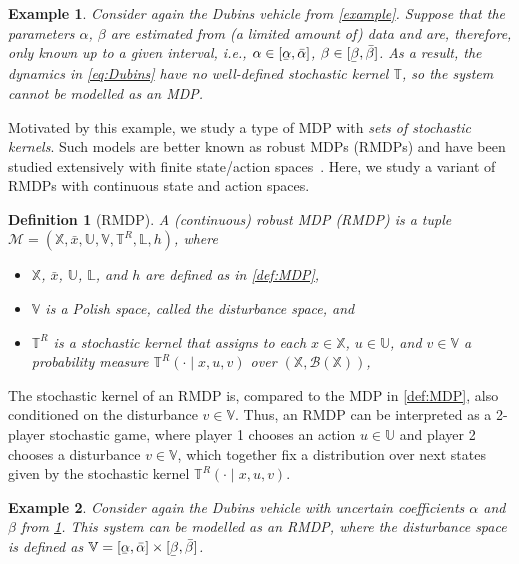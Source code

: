 \documentclass[letterpaper, 10 pt, conference]{ieeeconf}  %
\newcommand\munderbar[1]{%
  \underaccent{\bar}{#1}}
\newtheorem{example}{Example}
\newtheorem{definition}{Definition}
\newcommand*{\States}{\ensuremath{\mathbb{X}}}
\newcommand*{\Actions}{\ensuremath{\mathbb{U}}}
\newcommand*{\Disturb}{\ensuremath{\mathbb{V}}}
\newcommand*{\Labels}{\ensuremath{\mathbb{L}}}
\newcommand*{\initState}{\ensuremath{\bar{x}}}
\newcommand*{\transfunc}{\ensuremath{\mathbb{T}}}
\newcommand*{\transfuncR}{\ensuremath{\mathbb{T}^R}}
\newcommand*{\labelfunc}{\ensuremath{h}}
\newcommand*{\rmdp}{{\ensuremath{\mathcal{M}}}}
\newcommand*{\RMDP}{\ensuremath{\tuple{\States,\initState,\Actions,\Disturb,\transfuncR,\Labels,\labelfunc}}}
\newcommand*{\tuple}[1]{\left(#1\right)}
\newcommand*{\Borel}[1]{\ensuremath{\mathcal{B}(#1)}}
\begin{document}
\begin{example}
    \label{example2}
    Consider again the Dubins vehicle from \cref{example}.
    Suppose that the parameters $\alpha$, $\beta$ are estimated from (a limited amount of) data and are, therefore, only known up to a given interval, i.e., $\alpha \in [\munderbar{\alpha}, \bar{\alpha}]$, $\beta \in [\munderbar{\beta}, \bar{\beta}]$.
    As a result, the dynamics in \cref{eq:Dubins} have no well-defined stochastic kernel $\transfunc$, so the system cannot be modelled as an MDP.
\end{example}

Motivated by this example, we study a type of MDP with \emph{sets of stochastic kernels}.
Such models are better known as robust MDPs (RMDPs) and have been studied extensively with finite state/action spaces~\cite{DBLP:journals/ior/NilimG05,DBLP:journals/mor/WiesemannKR13}.
Here, we study a variant of RMDPs with continuous state and action spaces.

\begin{definition}[RMDP]
    \label{def:RMDP}
    A (continuous) robust MDP (RMDP) is a tuple $\rmdp = \RMDP$, where
    \begin{itemize}
        \item $\States$, $\initState$, $\Actions$, $\Labels$, and $\labelfunc$ are defined as in \cref{def:MDP},    
        \item $\Disturb$ is a Polish space, called the \emph{disturbance space}, and
        \item $\transfuncR$ is a \emph{stochastic kernel} that assigns to each $x \in \States$, $u \in \Actions$, and $v \in \Disturb$ a probability measure $\transfuncR(\cdot \mid x,u,v)$ over $(\States,\Borel{\States})$,
    \end{itemize}
\end{definition}

The stochastic kernel of an RMDP is, compared to the MDP in \cref{def:MDP}, also conditioned on the disturbance $v \in \Disturb$.
Thus, an RMDP can be interpreted as a 2-player stochastic game, where player 1 chooses an action $u \in \Actions$ and player 2 chooses a disturbance $v \in \Disturb$, which together fix a distribution over next states given by the stochastic kernel $\transfuncR(\cdot \mid x,u,v)$.


\begin{example}
    \label{example3}
    Consider again the Dubins vehicle with uncertain coefficients $\alpha$ and $\beta$ from \cref{example2}. 
    This system can be modelled as an RMDP, where the disturbance space is defined as $\Disturb = [\munderbar{\alpha}, \bar{\alpha}] \times [\munderbar{\beta}, \bar{\beta}]$.
\end{example}
\end{document}
